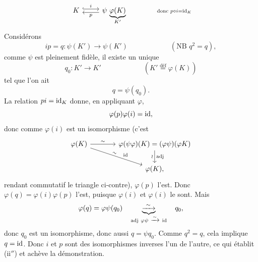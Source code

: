 \[
\begin{tikzcd}
K \arrow[r,hook,shift left,"i"] & \psi\,\underbrace{\varphi(K)}_{K'} \arrow[l,shift left,"p"]
\end{tikzcd}
\qquad\qquad {\scriptstyle \text{donc } p\circ i = \id_K}
\]
Considérons
\[
ip = q : \psi(K') \longrightarrow \psi(K') \qquad\qquad\qquad (\text{NB } q^2 = q),
\]
comme $\psi$ est pleinement fidèle, il existe un unique
\[
q_0 : K' \longrightarrow K' \qquad\qquad\qquad (K' \overset{\text{déf}}{=} \varphi(K))
\]
tel que l'on ait
\[
q = \psi(q_0).
\]
La relation $pi = \mathrm{id}_K$ donne, en appliquant $\varphi$,
\[
\varphi(p)\varphi(i) = \mathrm{id},
\]
donc comme $\varphi(i)$ est un isomorphisme (c'est
\[
\begin{tikzcd}[column sep=large]
\varphi(K) \arrow[r,"\sim"] \arrow[dr,"\sim"{sloped,pos=0.45},"\id"{pos=0.6}] & \varphi(\psi\varphi)(K) = (\varphi\psi)(\varphi K) \arrow[d,"\wr"',"\mathrm{adj}"] \\
 & \varphi(K),
\end{tikzcd}
\]
rendant commutatif le triangle ci-contre), $\varphi(p)$ l'est. Donc $\varphi(q) = \varphi(i)\varphi(p)$ l'est, puisque $\varphi(i)$ et $\varphi(i)$ le sont. Mais
\[
\varphi(q) = \varphi\psi(q_0) \quad \underbrace{\xrightarrow{\ \sim\ }}_{\mathrm{adj}\ \varphi\psi\ \xrightarrow{\sim}\ \id} \quad q_0,
\]
donc $q_0$ est un isomorphisme, donc aussi $q = \psi q_0$. Comme $q^2 = q$, cela implique $q = \mathrm{id}$. Donc $i$ et $p$ sont des isomorphismes inverses l'un de l'autre, ce qui établit (ii$''$) et achève la démonstration.

